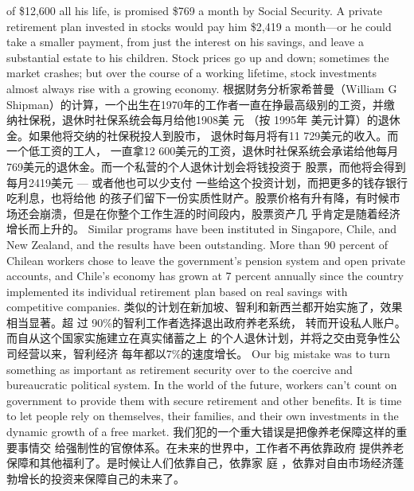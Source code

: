\begin{paracol}{2}
of \$12,600 all his life, is promised \$769 a month by Social Security. A private retirement plan invested in stocks would pay
him \$2,419 a month---or he could take a smaller payment,
from just the interest on his savings, and leave a substantial estate to his children. Stock prices go up and down; sometimes
the market crashes; but over the course of a working lifetime,
stock investments almost always rise with a growing economy.
\switchcolumn
根据财务分析家希普曼（William G Shipman）的计算，一个出生在1970年的工作者一直在挣最高级别的工资，并缴
纳社保税，退休时社保系统会每月给他1908美 元 （按 1995年
美元计算）的退休金。如果他将交纳的社保税投人到股市，
退休时每月将有11 729美元的收入。而一个低工资的工人，
一直拿12 600美元的工资，退休时社保系统会承诺给他每月
769美元的退休金。而一个私营的个人退休计划会将钱投资于
股票，而他将会得到每月2419美元 --- 或者他也可以少支付
一些给这个投资计划，而把更多的钱存银行吃利息，也将给他
的孩子们留下一份实质性财产。股票价格有升有降，有时候市
场还会崩溃，但是在你整个工作生涯的时间段内，股票资产几
乎肯定是随着经济增长而上升的。
\switchcolumn*
Similar programs have been instituted in Singapore, Chile,
and New Zealand, and the results have been outstanding. More
than 90 percent of Chilean workers chose to leave the government's pension system and open private accounts, and Chile's
economy has grown at 7 percent annually since the country implemented its individual retirement plan based on real savings
with competitive companies.
\switchcolumn
类似的计划在新加坡、智利和新西兰都开始实施了，效果
相当显著。超 过 90\%的智利工作者选择退出政府养老系统，
转而开设私人账户。而自从这个国家实施建立在真实储蓄之上
的个人退休计划，并将之交由竞争性公司经营以来，智利经济
每年都以7\%的速度增长。
\switchcolumn*
Our big mistake was to turn something as important as retirement security over to the coercive and bureaucratic political system. In the world of the future, workers can't count on
government to provide them with secure retirement and other
benefits. It is time to let people rely on themselves, their families, and their own investments in the dynamic growth of a free
market.
\switchcolumn
我们犯的一个重大错误是把像养老保障这样的重要事情交
给强制性的官僚体系。在未来的世界中，工作者不再依靠政府
提供养老保障和其他福利了。是时候让人们依靠自己，依靠家
庭 ，依靠对自由市场经济蓬勃增长的投资来保障自己的未来了。


\end{paracol}
